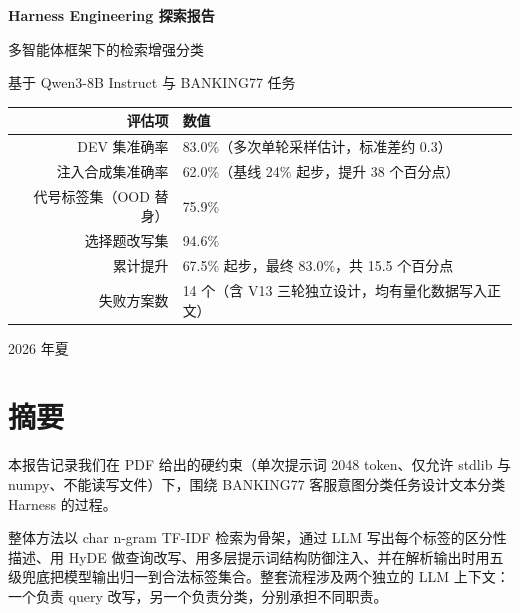\documentclass[11pt,a4paper]{article}
\begin{document}
\begin{titlepage}
\vspace*{2cm}
\centering
{\Huge\bfseries Harness Engineering 探索报告\par}
\vspace{0.6cm}
{\Large 多智能体框架下的检索增强分类\par}
\vspace{0.4cm}
{\large 基于 Qwen3-8B Instruct 与 BANKING77 任务\par}
\vspace{2cm}

\begin{tabular}{rl}
  \toprule
  评估项 & 数值 \\
  \midrule
  DEV 集准确率 & 83.0\%（多次单轮采样估计，标准差约 0.3）\\
  注入合成集准确率 & 62.0\%（基线 24\% 起步，提升 38 个百分点）\\
  代号标签集（OOD 替身） & 75.9\% \\
  选择题改写集 & 94.6\% \\
  \midrule
  累计提升 & 67.5\% 起步，最终 83.0\%，共 15.5 个百分点 \\
  失败方案数 & 14 个（含 V13 三轮独立设计，均有量化数据写入正文）\\
  \bottomrule
\end{tabular}

\vfill
{\large 2026 年夏\par}
\end{titlepage}

\section*{摘要}

本报告记录我们在 PDF 给出的硬约束（单次提示词 2048 token、仅允许 stdlib 与 numpy、不能读写文件）下，围绕 BANKING77 客服意图分类任务设计文本分类 Harness 的过程。

整体方法以 char n-gram TF-IDF 检索为骨架，通过 LLM 写出每个标签的区分性描述、用 HyDE 做查询改写、用多层提示词结构防御注入、并在解析输出时用五级兜底把模型输出归一到合法标签集合。整套流程涉及两个独立的 LLM 上下文：一个负责 query 改写，另一个负责分类，分别承担不同职责。
\end{document}
